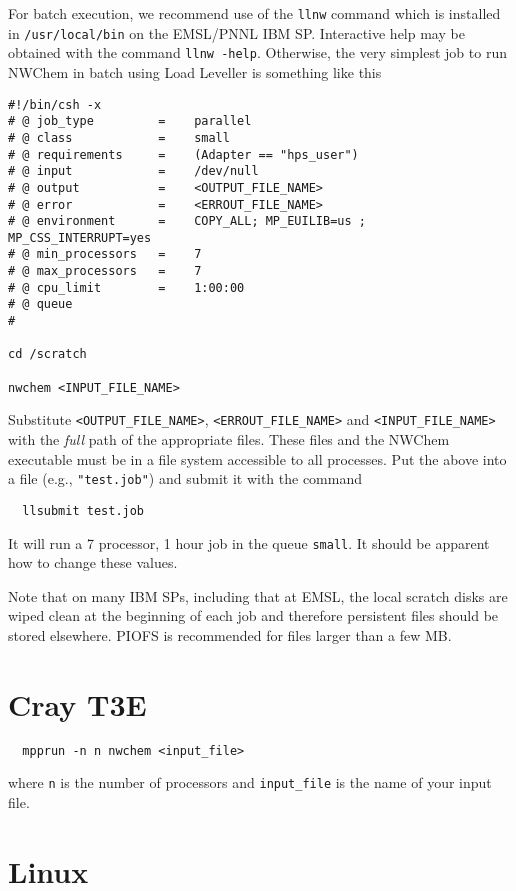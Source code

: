 For batch execution, we recommend use of the \verb+llnw+ command which
is installed in \verb+/usr/local/bin+ on the EMSL/PNNL IBM SP.
Interactive help may be obtained with the command \verb+llnw -help+.
Otherwise, the very simplest job to run NWChem in batch using Load
Leveller is something like this
\begin{verbatim}
#!/bin/csh -x
# @ job_type         =    parallel
# @ class            =    small
# @ requirements     =    (Adapter == "hps_user")
# @ input            =    /dev/null
# @ output           =    <OUTPUT_FILE_NAME>
# @ error            =    <ERROUT_FILE_NAME>
# @ environment      =    COPY_ALL; MP_EUILIB=us ; MP_CSS_INTERRUPT=yes
# @ min_processors   =    7
# @ max_processors   =    7
# @ cpu_limit        =    1:00:00
# @ queue
#

cd /scratch

nwchem <INPUT_FILE_NAME>
\end{verbatim}

Substitute \verb+<OUTPUT_FILE_NAME>+, \verb+<ERROUT_FILE_NAME>+ and
\verb+<INPUT_FILE_NAME>+ with the {\em full} path of the appropriate
files.  These files and the NWChem executable must be in a file system
accessible to all processes.  Put the above into a file (e.g.,
\verb+"test.job"+) and submit it with the command
\begin{verbatim}
  llsubmit test.job
\end{verbatim}
It will run a 7 processor, 1 hour job in the queue \verb+small+.  It
should be apparent how to change these values.

Note that on many IBM SPs, including that at EMSL, the local scratch
disks are wiped clean at the beginning of each job and therefore
persistent files should be stored elsewhere.  PIOFS is recommended for
files larger than a few MB.


\section{Cray T3E}

\begin{verbatim}
  mpprun -n n nwchem <input_file>
\end{verbatim}

where \verb+n+ is the number of processors and \verb+input_file+ is the
name of your input file.

\section{Linux}

